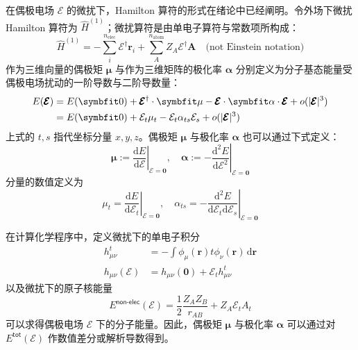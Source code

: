 在偶极电场 $\pmb{\mathcal{E}}$ 的微扰下，Hamilton 算符的形式\alert{在绪论中}已经阐明。令外场下微扰 Hamilton 算符为 $\hat H^{(1)}$；微扰算符是由单电子算符与常数项所构成：
\begin{equation}
  \label{eq.3.electric-perturbed-hamiltonian}
  \hat H^{(1)} = - \sum_i^{n_\mathrm{elec}} \pmb{\mathcal{E}}^\dagger \bm{r}_i + \sum_{A}^{n_\mathrm{atom}} Z_A \pmb{\mathcal{E}}^\dagger \bm{A} \quad \text{(not Einstein notation)}
\end{equation}
作为三维向量的偶极矩 $\bm{\mu}$ 与作为三维矩阵的极化率 $\bm{\alpha}$ 分别定义为分子基态能量受偶极电场扰动的一阶导数与二阶导数量\cite{Atkins-Friedman.Oxford.2011}：
\begin{align}
  E(\pmb{\mathcal{E}}) &= E(\bm{0}) + \pmb{\mathcal{E}}^\dagger \cdot \bm{\mu} - \pmb{\mathcal{E}} \cdot \bm{\alpha} \cdot \pmb{\mathcal{E}} + o(|\pmb{\mathcal{E}}|^3) \notag\\
  &= E(\bm{0}) + \mathcal{E}_t \mu_t - \mathcal{E}_t \alpha_{ts} \mathcal{E}_s + o(|\pmb{\mathcal{E}}|^3)
\end{align}
上式的 $t, s$ 指代坐标分量 $x, y, z$。偶极矩 $\bm{\mu}$ 与极化率 $\bm{\alpha}$ 也可以通过下式定义：
\begin{equation}
  \bm{\mu} := \left. \frac{\mathrm{d} E}{\mathrm{d} \pmb{\mathcal{E}}} \right|_{\pmb{\mathcal{E}} = \bm{0}}, \quad
  \bm{\alpha} := - \left. \frac{\mathrm{d}^2 E}{\mathrm{d} \pmb{\mathcal{E}}^2} \right|_{\pmb{\mathcal{E}} = \bm{0}}
\end{equation}
分量的数值定义为
\begin{equation}
  \mu_t = \left. \frac{\mathrm{d} E}{\mathrm{d} \mathcal{E}_t} \right|_{\pmb{\mathcal{E}} = \bm{0}}, \quad
  \alpha_{ts} = - \left. \frac{\mathrm{d}^2 E}{\mathrm{d} \mathcal{E}_t \mathrm{d} \mathcal{E}_s} \right|_{\pmb{\mathcal{E}} = \bm{0}}
\end{equation}

在计算化学程序中，定义微扰下的单电子积分
\begin{align}
  h_{\mu \nu}^{t} &= - \int \phi_\mu (\bm{r}) t \phi_\nu (\bm{r}) \, \mathrm{d} \bm{r} \\
  \label{eq.3.def.huv-with-perturb}
  h_{\mu \nu} (\pmb{\mathcal{E}}) &= h_{\mu \nu} (\bm{0}) + \mathcal{E}_t h_{\mu \nu}^t
\end{align}
以及微扰下的原子核能量
\begin{equation}
  E^\textsf{non-elec} (\pmb{\mathcal{E}}) = \frac{1}{2} \frac{Z_A Z_B}{r_{AB}} + Z_A \mathcal{E}_t A_t
\end{equation}
可以求得偶极电场 $\pmb{\mathcal{E}}$ 下的分子能量。因此，偶极矩 $\bm{\mu}$ 与极化率 $\bm{\alpha}$ 可以通过对 $E^\textsf{tot} (\pmb{\mathcal{E}})$ 作数值差分或解析导数得到。

